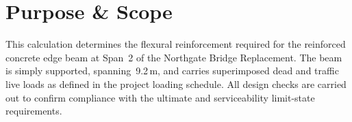 \section{Purpose \& Scope}
This calculation determines the flexural reinforcement required for the reinforced concrete edge beam at Span~2 of the Northgate Bridge Replacement. The beam is simply supported, spanning~9.2\,m, and carries superimposed dead and traffic live loads as defined in the project loading schedule. All design checks are carried out to confirm compliance with the ultimate and serviceability limit-state requirements.

